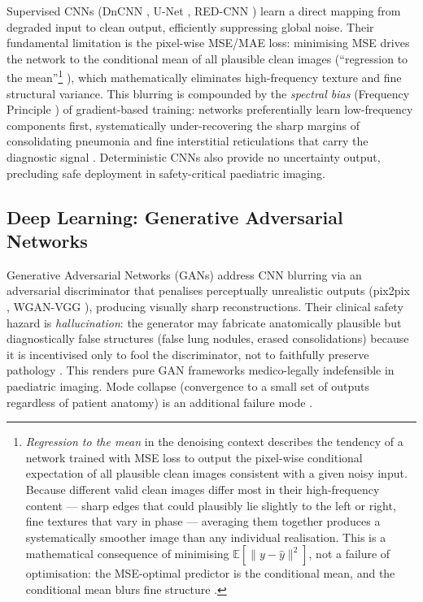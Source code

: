 \documentclass[12pt, a4paper, twoside, openright]{book}
\begin{document}
Supervised CNNs (DnCNN \cite{zhang_beyond_2017}, U-Net \cite{ronneberger_u-net_2015}, RED-CNN \cite{chen_low-dose_2017}) learn a direct mapping from degraded input to clean output, efficiently suppressing global noise. Their fundamental limitation is the pixel-wise MSE/MAE loss: minimising MSE drives the network to the conditional mean of all plausible clean images (``regression to the mean''\footnote{\emph{Regression to the mean} in the denoising context describes the tendency of a network trained with MSE loss to output the pixel-wise conditional expectation of all plausible clean images consistent with a given noisy input. Because different valid clean images differ most in their high-frequency content --- sharp edges that could plausibly lie slightly to the left or right, fine textures that vary in phase --- averaging them together produces a systematically smoother image than any individual realisation. This is a mathematical consequence of minimising $\mathbb{E}[\|y - \hat{y}\|^2]$, not a failure of optimisation: the MSE-optimal predictor is the conditional mean, and the conditional mean blurs fine structure \cite{zhao_loss_2017}.} \cite{zhao_loss_2017}), which mathematically eliminates high-frequency texture and fine structural variance. This blurring is compounded by the \textit{spectral bias} (Frequency Principle \cite{rahaman_spectral_2019, xu_frequency_2020}) of gradient-based training: networks preferentially learn low-frequency components first, systematically under-recovering the sharp margins of consolidating pneumonia and fine interstitial reticulations that carry the diagnostic signal \cite{wang_high-frequency_2020}. Deterministic CNNs also provide no uncertainty output, precluding safe deployment in safety-critical paediatric imaging.

\subsection{Deep Learning: Generative Adversarial Networks}
\label{sec:intro:existing:gan}

Generative Adversarial Networks (GANs) \cite{goodfellow_generative_2014} address CNN blurring via an adversarial discriminator that penalises perceptually unrealistic outputs (pix2pix \cite{isola_image--image_2017}, WGAN-VGG \cite{yang_low-dose_2018}), producing visually sharp reconstructions. Their clinical safety hazard is \textit{hallucination}: the generator may fabricate anatomically plausible but diagnostically false structures (false lung nodules, erased consolidations) because it is incentivised only to fool the discriminator, not to faithfully preserve pathology \cite{bhadra_hallucinations_2021}. This renders pure GAN frameworks medico-legally indefensible in paediatric imaging. Mode collapse (convergence to a small set of outputs regardless of patient anatomy) is an additional failure mode \cite{goodfellow_generative_2014}.
\end{document}
